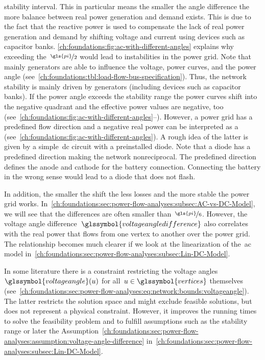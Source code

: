 stability interval. This in particular means the smaller the angle difference
the more balance between real power generation and demand exists. This is due to
the fact that the reactive power is used to compensate the lack of real power
generation and demand by shifting voltage and current using devices such as 
capacitor banks. \cref{ch:foundations:fig:ac-with-different-angles} explains why
exceeding the~$\nicefrac{\gls{pi}}{2}$ would lead to instabilities in the power
grid. Note that mainly generators are able to influence the voltage, power
curves, and the power angle
(see~\cref{ch:foundations:tbl:load-flow-bus-specification}). Thus, the network
stability is mainly driven by generators (including devices such as capacitor
banks). If the power angle exceeds the stability range the power curves shift
into the negative quadrant and the effective power values are negative, too
(see~\cref{ch:foundations:fig:ac-with-different-angles}--).
However, a power grid has a predefined flow direction and a negative real power
can be interpreted as a 
(see~\cref{ch:foundations:fig:ac-with-different-angles}).
% 
A rough idea of the latter is given by a simple~\gls{dc} circuit with a 
preinstalled diode. Note that a diode has a predefined direction making the
network nonreciprocal. The predefined direction defines the anode and cathode
for the battery connection. Connecting the battery in the wrong sense would lead
to a diode that does not flash.

In addition, the smaller the shift the less losses and the more stable the power
grid works.
In~\cref{ch:foundations:sec:power-flow-analyses:subsec:AC-vs-DC-Model}, we will
see that the differences are often smaller than~$\nicefrac{\gls{pi}}{6}$.
However, the voltage angle difference~$\glssymbol{voltageangledifference}$ also
correlates with the real power that flows from one vertex to another over the
power grid. The relationship becomes much clearer if we look at the
linearization of the~\gls{ac} model
in~\cref{ch:foundations:sec:power-flow-analyses:subsec:Lin-DC-Model}.

In some literature there is a constraint restricting the voltage
angles~$\glssymbol{voltageangle}(\vertexa)$ for
all~$\vertexa\in\glssymbol{vertices}$ themselves
(see~\cref{ch:foundations:sec:power-flow-analyses:eq:network:bounds:voltageangle}).
% 
\begin{equation}
    
\end{equation}
% 
The latter restricts the solution space and might exclude feasible solutions,
but does not represent a physical constraint. However, it improves the running
times to solve the feasibility problem and to fulfill assumptions such as the
stability range or later the
Assumption~\ref{ch:foundations:sec:power-flow-analyses:assumption:voltage-angle-difference}
in~\cref{ch:foundations:sec:power-flow-analyses:subsec:Lin-DC-Model}.

